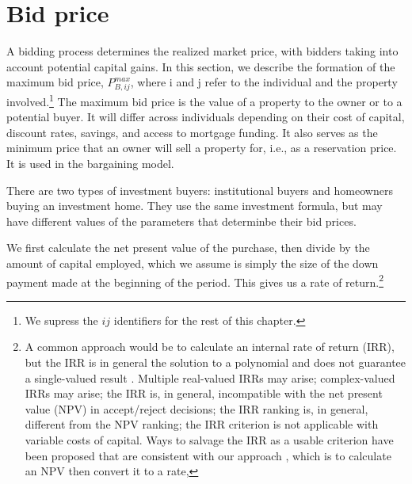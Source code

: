 {%

}




\section{Bid price}\label{sec_model_bid_price}
A bidding process determines the realized market price, with bidders taking into account potential capital gains. In this section, we describe the formation of the maximum bid price, $P_{B,ij}^{max}$, where i and j refer to the individual and the property involved.\footnote{We supress the $ij$ identifiers for the rest of this chapter. } The maximum bid price is the value of a property to the owner or to a potential buyer. It will differ across individuals depending on their cost of capital, discount rates,  savings, and access to mortgage funding. It also serves as the minimum price that an owner will sell a property for,  i.e., as a reservation price. It is used in the bargaining model.

There are two types of investment buyers: institutional buyers and homeowners buying an investment home. They use the same investment formula, but may have different values of the parameters that determinbe their bid prices.

We first calculate the net present value of the purchase, then divide by the amount of capital employed, which we assume is simply the size of the down payment made at the beginning of the period. This gives us a rate of return.\footnote{A common approach would be to calculate an internal rate of return (IRR), but  the IRR is in general the solution to a polynomial and does not guarantee a single-valued result \cite{robinsonOptimalTerminationIRR1996}. Multiple real-valued  IRRs may arise;  complex-valued IRRs may arise;  the IRR is, in general, incompatible with the net present value (NPV) in accept/reject decisions; the IRR ranking is, in general, different from the NPV ranking; the IRR criterion is not applicable with variable costs of capital. Ways to salvage the IRR as a usable criterion have been proposed that are consistent with our approach \cite{magniAverageInternalRate2010}, which is to calculate an NPV then convert it to a rate,} 


